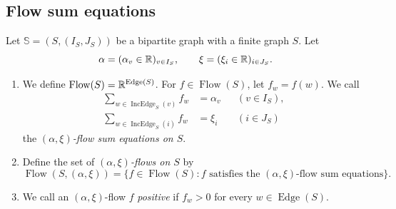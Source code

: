 \subsection{Flow sum equations}\label{subsec:flows-vertex-sums}
\begin{definition}\label{def:flows-vertex-sums}
Let $\mathbb S=(S,(I_S,J_S))$ be a bipartite graph with a finite graph $S$. Let
\[
 \alpha=(\alpha_v\in\mathbb R)_{v\in I_{S}},\qquad
 \xi=(\xi_i\in\mathbb R)_{i\in J_{S}}.
\]
\begin{enumerate}[font=\itshape]
\item We define $\operatorname{Flow}(S)=\mathbb R^{\operatorname{Edge}(S)}$.
For $f\in\operatorname{Flow}(S)$, let $f_w=f(w)$.
We call
\[
\begin{aligned}
 \sum_{w\in\operatorname{IncEdge}_S(v)}f_w&=\alpha_v
 &&(v\in I_{S}),\\
 \sum_{w\in\operatorname{IncEdge}_S(i)}f_w&=\xi_i
 &&(i\in J_{S})
\end{aligned}
\]
the \textit{$(\alpha,\xi)$-flow sum equations on $S$}.
\item Define the set of \textit{$(\alpha,\xi)$-flows on $S$} by
\[
 \operatorname{Flow}(S,(\alpha,\xi))=
 \{f\in\operatorname{Flow}(S):f\text{ satisfies the }(\alpha,\xi)\text{-flow sum equations}\}.
\]
\item We call an $(\alpha,\xi)$-flow $f$ \textit{positive} if $f_w>0$ for every $w\in\operatorname{Edge}(S)$.
\end{enumerate}
\end{definition}

